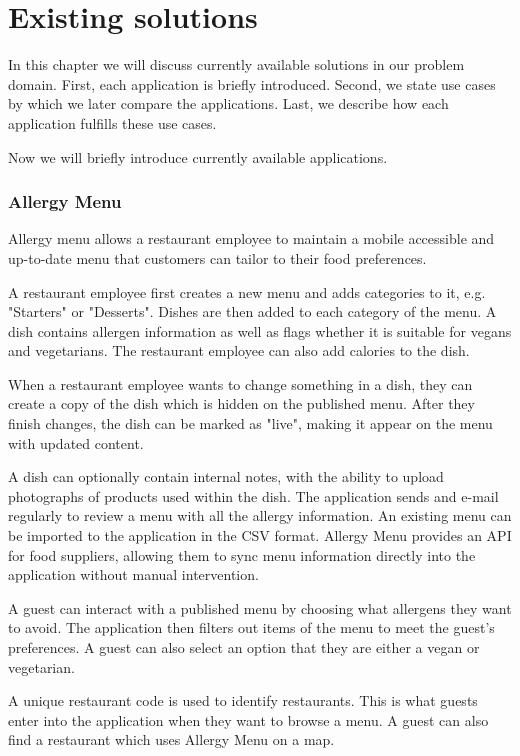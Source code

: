 \chapter{Existing solutions}
In this chapter we will discuss currently available solutions in our problem domain.
First, each application is briefly introduced.
Second, we state use cases by which we later compare the applications.
Last, we describe how each application fulfills these use cases.

Now we will briefly introduce currently available applications.

\subsection*{Allergy Menu}
  Allergy menu allows a restaurant employee to maintain a mobile accessible and up-to-date menu that customers can tailor to their food preferences.
  
  A restaurant employee first creates a new menu and adds categories to it, e.g. "Starters" or "Desserts".
  Dishes are then added to each category of the menu.
  A dish contains allergen information as well as flags whether it is suitable for vegans and vegetarians.
  The restaurant employee can also add calories to the dish.

  When a restaurant employee wants to change something in a dish, they can create a copy of the dish which is hidden on the published menu.
  After they finish changes, the dish can be marked as "live", making it appear on the menu with updated content. 

  A dish can optionally contain internal notes, with the ability to upload photographs of products used within the dish.
  The application sends and e-mail regularly to review a menu with all the allergy information.
  An existing menu can be imported to the application in the CSV format.
  Allergy Menu provides an API for food suppliers, allowing them to sync menu information directly into the application without manual intervention.
  
  A guest can interact with a published menu by choosing what allergens they want to avoid.
  The application then filters out items of the menu to meet the guest's preferences.
  A guest can also select an option that they are either a vegan or vegetarian.
  
  A unique restaurant code is used to identify restaurants. 
  This is what guests enter into the application when they want to browse a menu.
  A guest can also find a restaurant which uses Allergy Menu on a map.

